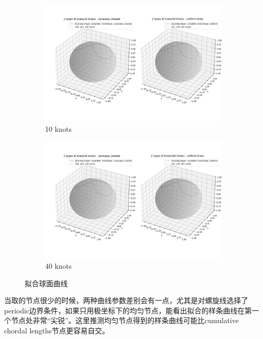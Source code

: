 \documentclass[UTF8]{ctexart}
\begin{document}
\begin{figure}[H]
	\centering
	\begin{subfigure}[b]{0.45\textwidth}
		\centering
		\includegraphics[width=\textwidth]{../figure/plot_7.png}
		\caption{10 knots}
		\label{fig:image1}
	\end{subfigure}
	\hspace{0.5cm}  %
	\begin{subfigure}[b]{0.45\textwidth}
		\centering
		\includegraphics[width=\textwidth]{../figure/plot_11.png}
		\caption{40 knots}
		\label{fig:image2}
	\end{subfigure}
	\caption{拟合球面曲线} 
	\label{fig:two_images}
\end{figure}
当取的节点很少的时候，两种曲线参数差别会有一点，尤其是对螺旋线选择了periodic边界条件，如果只用极坐标下的均匀节点，能看出拟合的样条曲线在第一个节点处非常“尖锐”。这里推测均匀节点得到的样条曲线可能比cumulative chordal lengths节点更容易自交。
\end{document}
